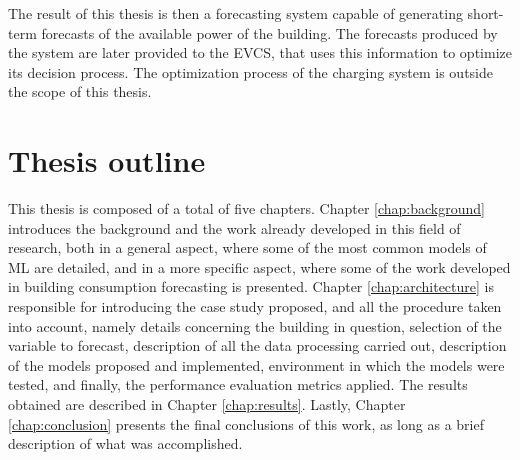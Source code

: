 The result of this thesis is then a forecasting system capable of generating short-term forecasts of the available power of the building. The forecasts produced by the system are later provided to the \ac{EVCS}, that uses this information to optimize its decision process. The optimization process of the charging system is outside the scope of this thesis.

\section{Thesis outline}

This thesis is composed of a total of five chapters. Chapter \ref{chap:background} introduces the background and the work already developed in this field of research, both in a general aspect, where some of the most common models of \ac{ML} are detailed, and in a more specific aspect, where some of the work developed in building consumption forecasting is presented. Chapter \ref{chap:architecture} is responsible for introducing the case study proposed, and all the procedure taken into account, namely details concerning the building in question, selection of the variable to forecast, description of all the data processing carried out, description of the models proposed and implemented, environment in which the models were tested, and finally, the performance evaluation metrics applied. The results obtained are described in Chapter \ref{chap:results}. Lastly, Chapter \ref{chap:conclusion} presents the final conclusions of this work, as long as a brief description of what was accomplished.